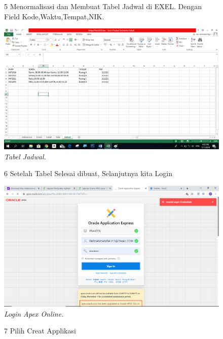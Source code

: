 \begin{enumerate}
\begin{figure}
\item[5]Menormalisasi dan Membuat Tabel Jadwal di EXEL. Dengan Field Kode,Waktu,Tempat,NIK.

    \begin{center}
    \includegraphics[scale=0.4]{figures/5.png}
    \caption{\textit{Tabel Jadwal.}}
    \end{center}
    \label{gambar}
    \end{figure}

\begin{figure}
\item[6] Setelah Tabel Selesai dibuat, Selanjutnya kita Login

    \begin{center}
    \includegraphics[scale=0.3]{figures/6.png}
    \caption{\textit{Login Apex Online.}}
     \end{center}
    \label{gambar}
    \end{figure}

\begin{figure}
\item[7]Pilih Creat Applikasi


\end{figure}
\end{enumerate}
